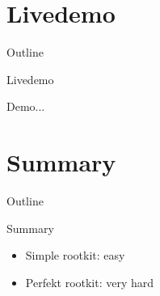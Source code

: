 \documentclass[]{beamer}
\begin{document}
\section{Livedemo}
\begin{frame}[t]{Outline}
  \tableofcontents[currentsection]
\end{frame}

\begin{frame}[t]{Livedemo}
   \begin{center} \LARGE{Demo...} \end{center}
\end{frame}

\section{Summary}
\begin{frame}[t]{Outline}
\tableofcontents[currentsection]
\end{frame}

\begin{frame}[t]{Summary}
\begin{itemize}
  \item Simple rootkit: easy
  \item Perfekt rootkit: very hard
\end{itemize}
\end{frame}
\end{document}
